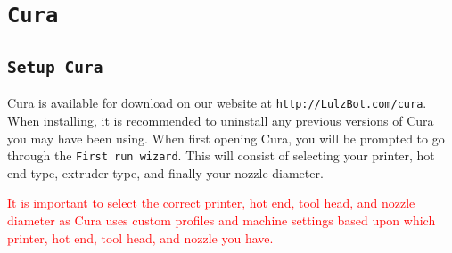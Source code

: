 %
%
%
%
%

\section{\texttt{Cura}}
\label{Cura}

\subsection{\texttt{Setup Cura}}
Cura is available for download on our website at \texttt{http://LulzBot.com/cura}. When installing, it is recommended to uninstall any previous versions of Cura you may have been using. 
When first opening Cura, you will be prompted to go through the \texttt{First run wizard}. This will consist of selecting your printer, hot end type, extruder type, and finally your nozzle diameter.

\textcolor{red}{It is important to select the correct printer, hot end, tool head, and nozzle diameter as Cura uses custom profiles and machine settings based upon which printer, hot end, tool head, and nozzle you have.}

